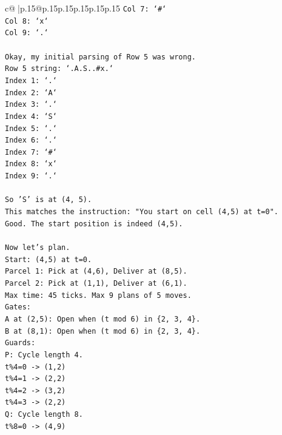 \documentclass{article}
\begin{document}
{\begin{supertabular}{c@{$\;$}|p{.15\linewidth}@{}p{.15\linewidth}p{.15\linewidth}p{.15\linewidth}p{.15\linewidth}p{.15\linewidth}}
{{{\texttt{Col 7: `\#`} \\
\texttt{Col 8: `x`} \\
\texttt{Col 9: `.`} \\
\\ 
\texttt{Okay, my initial parsing of Row 5 was wrong.} \\
\texttt{Row 5 string: `.A.S..\#x.`} \\
\texttt{Index 1: `.`} \\
\texttt{Index 2: `A`} \\
\texttt{Index 3: `.`} \\
\texttt{Index 4: `S`} \\
\texttt{Index 5: `.`} \\
\texttt{Index 6: `.`} \\
\texttt{Index 7: `\#`} \\
\texttt{Index 8: `x`} \\
\texttt{Index 9: `.`} \\
\\ 
\texttt{So 'S' is at (4, 5).} \\
\texttt{This matches the instruction: "You start on cell (4,5) at t=0".} \\
\texttt{Good. The start position is indeed (4,5).} \\
\\ 
\texttt{Now let's plan.} \\
\texttt{Start: (4,5) at t=0.} \\
\texttt{Parcel 1: Pick at (4,6), Deliver at (8,5).} \\
\texttt{Parcel 2: Pick at (1,1), Deliver at (6,1).} \\
\texttt{Max time: 45 ticks. Max 9 plans of 5 moves.} \\
\texttt{Gates:} \\
\texttt{A at (2,5): Open when (t mod 6) in \{2, 3, 4\}.} \\
\texttt{B at (8,1): Open when (t mod 6) in \{2, 3, 4\}.} \\
\texttt{Guards:} \\
\texttt{P: Cycle length 4.} \\
\texttt{t\%4=0 {-}> (1,2)} \\
\texttt{t\%4=1 {-}> (2,2)} \\
\texttt{t\%4=2 {-}> (3,2)} \\
\texttt{t\%4=3 {-}> (2,2)} \\
\texttt{Q: Cycle length 8.} \\
\texttt{t\%8=0 {-}> (4,9)} \\
}}}
\end{supertabular}}
\end{document}
